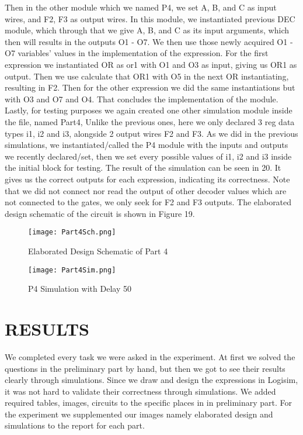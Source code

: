 \documentclass[pdftex,12pt,a4paper]{article}
\begin{document}
Then in the other module which we named P4, we set A, B, and C as input wires, and F2, F3 as output wires. In this module, we instantiated previous DEC module, which through that we give A, B, and C as its input arguments, which then will results in the outputs O1 - O7. We then use those newly acquired O1 - O7 variables' values in the implementation of the expression. For the first expression we instantiated OR as or1 with O1 and O3 as input, giving us OR1 as output. Then we use calculate that OR1 with O5 in the next OR instantiating, resulting in F2. Then for the other expression we did the same instantiations but with O3 and O7 and O4. That concludes the implementation of the module. Lastly, for testing purposes we again created one other simulation module inside the file, named Part4, Unlike the previous ones, here we only declared 3 reg data types i1, i2 and i3, alongside 2 output wires F2 and F3. As we did in the previous simulations, we instantiated/called the P4 module with the inputs and outputs we recently declared/set, then we set every possible values of i1, i2 and i3 inside the initial block for testing. The result of the simulation can be seen in 20. It gives us the correct outputs for each expression, indicating its correctness. Note that we did not connect nor read the output of other decoder values which are not connected to the gates, we only seek for F2 and F3 outputs. The elaborated design schematic of the circuit is shown in Figure 19.

\begin{figure}[ht]
	\centering
	\texttt{[image: Part4Sch.png]}
	\caption{Elaborated Design Schematic of Part 4}
	\label{fig1}
\end{figure}

\begin{figure}[ht]
	\centering
	\texttt{[image: Part4Sim.png]}
	\caption{{P4 Simulation with Delay 50}}
	\label{fig1}
\end{figure}


\section{RESULTS }
We completed every task we were asked in the experiment. At first we solved the questions in the preliminary part by hand, but then we got to see their results clearly through simulations. Since we draw and design the expressions in Logisim, it was not hard to validate their correctness through simulations. We added required tables, images, circuits to the specific places in in preliminary part. For the experiment we supplemented our images namely elaborated design and simulations to the report for each part.
\end{document}

